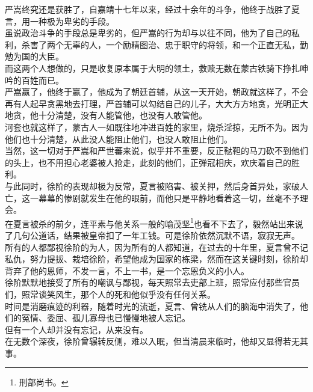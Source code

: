 \begin{multicols}{\theparacolNo}
严嵩终究还是获胜了，自嘉靖十七年以来，经过十余年的斗争，他终于战胜了夏言，用一种极为卑劣的手段。\\

虽说政治斗争的手段总是卑劣的，但严嵩的行为却与以往不同，他为了自己的私利，杀害了两个无辜的人，一个励精图治、忠于职守的将领，和一个正直无私，勤勉为国的大臣。\\

而这两个人想做的，只是收复原本属于大明的领土，救赎无数在蒙古铁骑下挣扎呻吟的百姓而已。\\

严嵩赢了，他终于赢了，他成为了朝廷首辅，从这一天开始，朝政就这样了，不会再有人起早贪黑地去打理，严首辅可以勾结自己的儿子，大大方方地贪，光明正大地贪，他十分清楚，没有人能管他，也没有人敢管他。\\

河套也就这样了，蒙古人一如既往地冲进百姓的家里，烧杀淫掠，无所不为。因为他们也十分清楚，从此没人能阻止他们，也没人敢阻止他们。\\

当然，这一切对于严嵩和严世蕃来说，似乎并不重要，反正鞑靼的马刀砍不到他们的头上，也不用担心老婆被人抢走，此刻的他们，正弹冠相庆，欢庆着自己的胜利。\\

与此同时，徐阶的表现却极为反常，夏言被陷害、被关押，然后身首异处，家破人亡，这一幕幕的惨剧就发生在他的眼前，而他只是平静地看着这一切，丝毫不予理会。\\

在夏言被杀的前夕，连平素与他关系一般的喻茂坚\footnote{刑部尚书。}也看不下去了，毅然站出来说了几句公道话，结果被皇帝扣了一年工钱。可是徐阶依然沉默不语，寂寂无声。\\

所有的人都鄙视徐阶的为人，因为所有的人都知道，在过去的十年里，夏言曾不记私仇，努力提拔、栽培徐阶，希望他成为国家的栋梁，然而在这关键时刻，徐阶却背弃了他的恩师，不发一言，不上一书，是一个忘恩负义的小人。\\

徐阶默默地接受了所有的嘲讽与鄙视，每天照常去吏部上班，照常应付那些官员们，照常谈笑风生，那个人的死和他似乎没有任何关系。\\

时间是消磨痕迹的利器，随着时光的流逝，夏言、曾铣从人们的脑海中消失了，他们的冤情、委屈、孤儿寡母也已慢慢地被人忘记。\\

但有一个人却并没有忘记，从来没有。\\

在无数个深夜，徐阶曾辗转反侧，难以入眠，但当清晨来临时，他却又显得若无其事。\\


\end{multicols}
